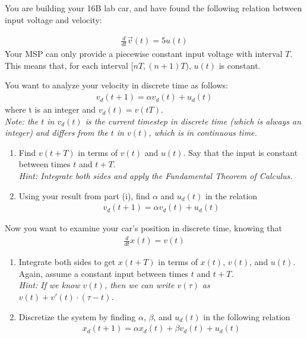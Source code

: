 
You are building your 16B lab car, and have found the following relation between input voltage and velocity:

\begin{align*}
    \frac{d}{dt} \vec{v}(t) = 5u(t)
\end{align*}
Your MSP can only provide a piecewise constant input voltage with interval $T$. This means that, for each interval $[nT, (n + 1)T)$, $u(t)$ is constant.

\begin{enumerate}
    \qitem You want to analyze your velocity in discrete time as follows:
    \begin{align*}
        v_d(t + 1) = \alpha v_d(t) + u_d(t)
    \end{align*}
    where t is an integer and $v_d(t) = v(tT)$. \\
    \textit{Note: the $t$ in $v_d(t)$ is the current timestep in discrete time (which is always an integer) and differs from the $t$ in $v(t)$, which is in continuous time.}
    \begin{enumerate}[label=(\roman*)]
        \item Find $v(t + T)$ in terms of $v(t)$ and $u(t)$. Say that the input is constant between times $t$ and $t + T$. \\
        \textit{Hint: Integrate both sides and apply the Fundamental Theorem of Calculus.}

        \item Using your result from part (i), find $\alpha$ and $u_d(t)$ in the relation
        \begin{align*}
            v_d(t + 1) = \alpha v_d(t) + u_d(t)
        \end{align*}
    \end{enumerate}

    \qitem Now you want to examine your car's position in discrete time, knowing that
    \begin{align*}
        \frac{d}{dt} x(t) = v(t)
    \end{align*}

    \begin{enumerate}[label=(\roman*)]
        \item Integrate both sides to get $x(t + T)$ in terms of $x(t)$, $v(t)$, and $u(t)$. Again, assume a constant input between times $t$ and $t + T$. \\
        \textit{Hint: If we know $v(t)$, then we can write $v(\tau)$ as $v(t) + v'(t) \cdot (\tau - t)$.}

        \item Discretize the system by finding $\alpha$, $\beta$, and $u_d(t)$ in the following relation
        \begin{align*}
            x_d(t + 1) = \alpha x_d(t) + \beta v_d(t) + u_d(t)
        \end{align*}
    \end{enumerate}

\end{enumerate}